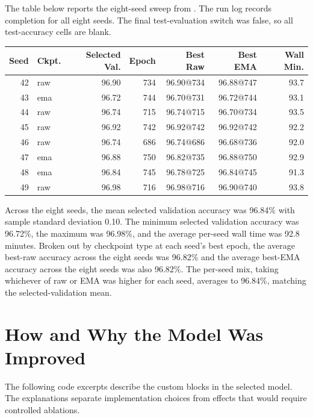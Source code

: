 \documentclass[11pt]{article}
\begin{document}
The table below reports the eight-seed sweep from .
The run log records completion for all eight seeds.
The final test-evaluation switch was false, so all test-accuracy cells are blank.

\begin{center}
\begin{tabular}{rlrrrrr}
\toprule
\textbf{Seed} & \textbf{Ckpt.} & \textbf{Selected Val.} & \textbf{Epoch} &
\textbf{Best Raw} & \textbf{Best EMA} & \textbf{Wall Min.} \\
\midrule
42 & raw & 96.90 & 734 & 96.90@734 & 96.88@747 & 93.7 \\
43 & ema & 96.72 & 744 & 96.70@731 & 96.72@744 & 93.1 \\
44 & raw & 96.74 & 715 & 96.74@715 & 96.70@734 & 93.5 \\
45 & raw & 96.92 & 742 & 96.92@742 & 96.92@742 & 92.2 \\
46 & raw & 96.74 & 686 & 96.74@686 & 96.68@736 & 92.0 \\
47 & ema & 96.88 & 750 & 96.82@735 & 96.88@750 & 92.9 \\
48 & ema & 96.84 & 745 & 96.78@725 & 96.84@745 & 91.3 \\
49 & raw & 96.98 & 716 & 96.98@716 & 96.90@740 & 93.8 \\
\bottomrule
\end{tabular}
\end{center}

Across the eight seeds, the mean selected validation accuracy was 96.84\% with sample
standard deviation 0.10. The minimum selected validation accuracy was 96.72\%, the
maximum was 96.98\%, and the average per-seed wall time was 92.8 minutes. Broken out
by checkpoint type at each seed's best epoch, the average best-raw accuracy across the
eight seeds was 96.82\% and the average best-EMA accuracy across the eight seeds was
also 96.82\%. The per-seed mix, taking whichever of raw or EMA was higher for each
seed, averages to 96.84\%, matching the selected-validation mean.

\clearpage
\section{How and Why the Model Was Improved}

The following code excerpts describe the custom blocks in the selected model. The explanations separate implementation choices from effects that would require controlled ablations.
\end{document}
